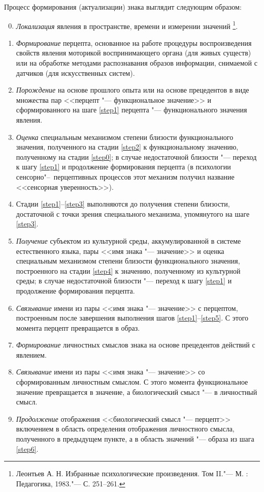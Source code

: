 Процесс формирования (актуализации) знака выглядит следующим образом:
\begin{enumerate}
	\setcounter{enumi}{-1}
	\renewcommand\labelenumi{\theenumi.}
	\item\label{step0} \textit{Локализация} явления в пространстве, времени и измерении значений \footnote{Леонтьев А. Н. Избранные психологические произведения. Том II."--- М. : Педагогика,
		1983."--- С. 251--261.}.
	\item\label{step1} \textit{Формирование} перцепта, основанное на работе процедуры воспроизведения свойств явления моторикой воспринимающего органа (для живых существ) или на обработке методами распознавания образов информации, снимаемой с датчиков (для искусственных систем).
	\item\label{step2} \textit{Порождение} на основе прошлого опыта или на основе прецедентов в виде множества пар <<перцепт "--- функциональное значение>> и сформированного на шаге \ref{step1} перцепта "--- функционального значения явления.
	\item\label{step3} \textit{Оценка} специальным механизмом степени близости функционального значения, полученного на стадии \ref{step2} к функциональному значению, полученному на стадии \ref{step0}; в случае недостаточной близости "--- переход к шагу \ref{step1} и продолжение формирования перцепта (в психологии сенсорно"--~перцептивных процессов этот механизм получил название <<сенсорная уверенность>>).
	\item\label{step4} Стадии \ref{step1}--\ref{step3} выполняются до получения степени близости, достаточной с точки зрения специального механизма, упомянутого на шаге \ref{step3}.
	\item\label{step5} \textit{Получение} субъектом из культурной среды, аккумулированной в системе естественного языка, пары <<имя знака "--- значение>> и оценка специальным механизмом степени близости функционального значения, построенного на стадии \ref{step4} к значению, полученному из культурной среды; в случае недостаточной близости "--- переход к шагу \ref{step1} и продолжение формирования перцепта.
	\item\label{step6} \textit{Связывание} имени из пары <<имя знака "--- значение>> с перцептом, построенным после завершения выполнения шагов \ref{step1}--\ref{step5}. С этого момента перцепт превращается в образ.
	\item \textit{Формирование} личностных смыслов знака на основе прецедентов действий с явлением.
	\item \textit{Связывание} имени из пары <<имя знака "--- значение>> со сформированным личностным смыслом. С этого момента функциональное значение превращается в значение, а биологический смысл "--- в личностный смысл.
	\item \textit{Продолжение} отображения <<биологический смысл "--- перцепт>> включением в область определения отображения личностного смысла, полученного в предыдущем пункте, а в область значений "--- образа из шага \ref{step6}.
\end{enumerate}

